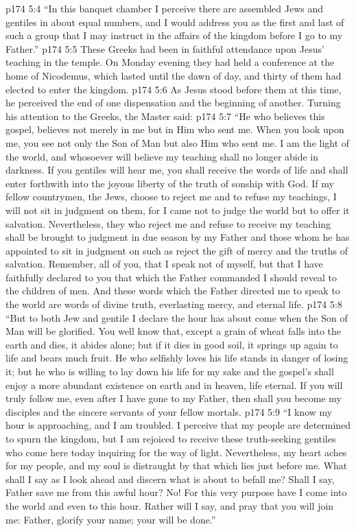 \vs p174 5:4 \textcolor{ubdarkred}{“In this banquet chamber I perceive there are assembled Jews and gentiles in about equal numbers, and I would address you as the first and last of such a group that I may instruct in the affairs of the kingdom before I go to my Father.”}
\vs p174 5:5 These Greeks had been in faithful attendance upon Jesus’ teaching in the temple. On Monday evening they had held a conference at the home of Nicodemus, which lasted until the dawn of day, and thirty of them had elected to enter the kingdom.
\vs p174 5:6 As Jesus stood before them at this time, he perceived the end of one dispensation and the beginning of another. Turning his attention to the Greeks, the Master said:
\pc \vs p174 5:7 \textcolor{ubdarkred}{“He who believes this gospel, believes not merely in me but in Him who sent me. When you look upon me, you see not only the Son of Man but also Him who sent me. I am the light of the world, and whosoever will believe my teaching shall no longer abide in darkness. If you gentiles will hear me, you shall receive the words of life and shall enter forthwith into the joyous liberty of the truth of sonship with God. If my fellow countrymen, the Jews, choose to reject me and to refuse my teachings, I will not sit in judgment on them, for I came not to judge the world but to offer it salvation. Nevertheless, they who reject me and refuse to receive my teaching shall be brought to judgment in due season by my Father and those whom he has appointed to sit in judgment on such as reject the gift of mercy and the truths of salvation. Remember, all of you, that I speak not of myself, but that I have faithfully declared to you that which the Father commanded I should reveal to the children of men. And these words which the Father directed me to speak to the world are words of divine truth, everlasting mercy, and eternal life.}
\vs p174 5:8 \textcolor{ubdarkred}{“But to both Jew and gentile I declare the hour has about come when the Son of Man will be glorified. You well know that, except a grain of wheat falls into the earth and dies, it abides alone; but if it dies in good soil, it springs up again to life and bears much fruit. He who selfishly loves his life stands in danger of losing it; but he who is willing to lay down his life for my sake and the gospel’s shall enjoy a more abundant existence on earth and in heaven, life eternal. If you will truly follow me, even after I have gone to my Father, then shall you become my disciples and the sincere servants of your fellow mortals.}
\vs p174 5:9 \textcolor{ubdarkred}{“I know my hour is approaching, and I am troubled. I perceive that my people are determined to spurn the kingdom, but I am rejoiced to receive these truth\hyp{}seeking gentiles who come here today inquiring for the way of light. Nevertheless, my heart aches for my people, and my soul is distraught by that which lies just before me. What shall I say as I look ahead and discern what is about to befall me? Shall I say, Father save me from this awful hour? No! For this very purpose have I come into the world and even to this hour. Rather will I say, and pray that you will join me: Father, glorify your name; your will be done.”}
